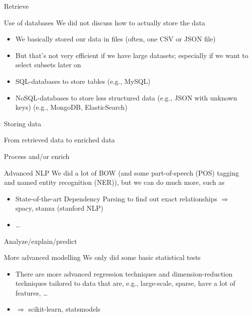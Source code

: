 \documentclass[compress]{beamer}
\begin{document}
\begin{frame}{Retrieve}
	\begin{block}{Use of databases \parencite{Guenther2018}}
		We did not discuss how to actually store the data
		\begin{itemize}
			\item We basically stored our data in files (often, one CSV or JSON file)
			\item But that's not very efficient if we have large datasets; especially if we want to select subsets later on
			\item SQL-databases to store tables (e.g., MySQL)
			\item NoSQL-databases to store less structured data (e.g., JSON with unknown keys) (e.g., MongoDB, ElasticSearch)
		\end{itemize}
	\end{block}
\end{frame}





\begin{frame}{Storing data}
\end{frame}




\begin{frame}{From retrieved data to enriched data}
\end{frame}

\begin{frame}{Process and/or enrich}
	\begin{block}{Advanced NLP}
        		We did a lot of BOW (and some part-of-speech (POS) tagging and named entity recognition (NER)), but we can do much more, such as 
		\begin{itemize}
			\item State-of-the-art Dependency Parsing to find out exact relationships
			$\Rightarrow$  spacy, stanza (stanford NLP)
                        \item \ldots
		\end{itemize}
	\end{block}
\end{frame}


 
\begin{frame}{Analyze/explain/predict}
	\begin{block}{More advanced modelling}
		We only did some basic statistical tests
		\begin{itemize}
			\item There are more advanced regression techniques and dimension-reduction techniques tailored to data that are, e.g., large-scale, sparse, have a lot of features, \ldots
			\item $\Rightarrow$ scikit-learn, statsmodels
		\end{itemize}
	\end{block}
\end{frame}
\end{document}
